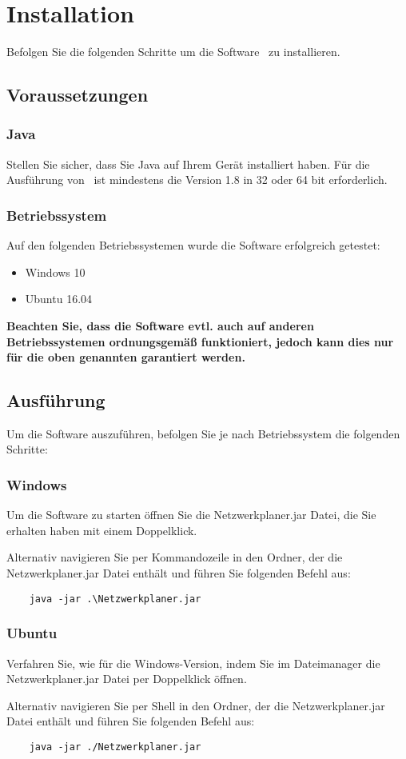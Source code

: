\section{Installation}
Befolgen Sie die folgenden Schritte um die Software \subnetcalc\ zu installieren.

\subsection{Voraussetzungen}

\subsubsection{Java}
Stellen Sie sicher, dass Sie Java auf Ihrem Gerät installiert haben. Für die
Ausführung von \subnetcalc\ ist mindestens die Version 1.8 in 32 oder 64 bit erforderlich.

\subsubsection{Betriebssystem}
Auf den folgenden Betriebssystemen wurde die Software erfolgreich getestet:
\begin{itemize}
    \item Windows 10
    \item Ubuntu 16.04
\end{itemize}

\textbf{Beachten Sie, dass die Software evtl. auch auf anderen Betriebssystemen
ordnungsgemäß funktioniert, jedoch kann dies nur für die oben genannten
garantiert werden.}

\subsection{Ausführung}
Um die Software auszuführen, befolgen Sie je nach Betriebssystem die folgenden
Schritte:

\subsubsection{Windows}
Um die Software zu starten öffnen Sie die Netzwerkplaner.jar Datei, die Sie
erhalten haben mit einem Doppelklick.

Alternativ navigieren Sie per Kommandozeile in den Ordner, der die
Netzwerkplaner.jar Datei enthält und führen Sie folgenden Befehl aus:

\begin{lstlisting}
    java -jar .\Netzwerkplaner.jar
\end{lstlisting}

\subsubsection{Ubuntu}
Verfahren Sie, wie für die Windows-Version, indem Sie im Dateimanager
die Netzwerkplaner.jar Datei per Doppelklick öffnen.

Alternativ navigieren Sie per Shell in den Ordner, der die
Netzwerkplaner.jar Datei enthält und führen Sie folgenden Befehl aus:

\begin{lstlisting}
    java -jar ./Netzwerkplaner.jar
\end{lstlisting}